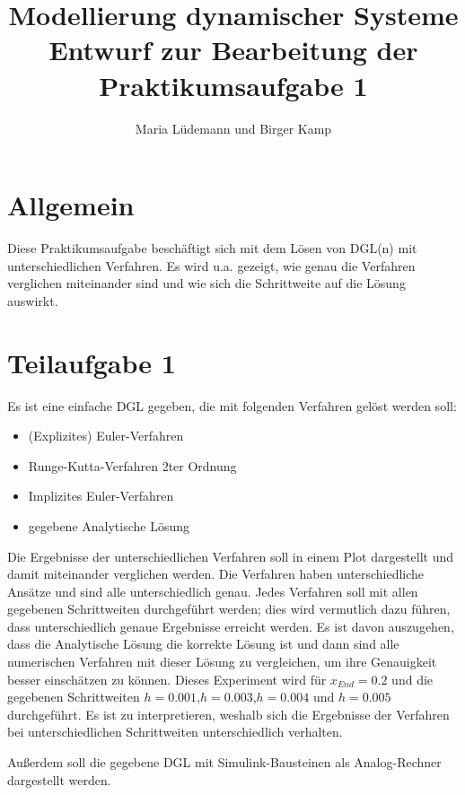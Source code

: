 \documentclass[]{scrartcl}
\title{Modellierung dynamischer Systeme  \\ Entwurf zur Bearbeitung der Praktikumsaufgabe 1}
\author{Maria Lüdemann und Birger Kamp}
\begin{document}
\maketitle

\begin{abstract}

\end{abstract}

\section{Allgemein}
Diese Praktikumsaufgabe beschäftigt sich mit dem Lösen von DGL(n) mit unterschiedlichen Verfahren. Es wird u.a. gezeigt, wie genau die Verfahren verglichen miteinander sind und wie sich die Schrittweite auf die Lösung auswirkt.

\section{Teilaufgabe 1}
Es ist eine einfache DGL gegeben, die mit folgenden Verfahren gelöst werden soll:

\begin{itemize}
	\item (Explizites) Euler-Verfahren
	\item Runge-Kutta-Verfahren 2ter Ordnung
	\item Implizites Euler-Verfahren
	\item gegebene Analytische Lösung
\end{itemize}

Die Ergebnisse der unterschiedlichen Verfahren soll in einem Plot dargestellt und damit miteinander verglichen werden. Die Verfahren haben unterschiedliche Ansätze und sind alle unterschiedlich genau. Jedes Verfahren soll mit allen gegebenen Schrittweiten durchgeführt werden; dies wird vermutlich dazu führen, dass unterschiedlich genaue Ergebnisse erreicht werden. Es ist davon auszugehen, dass die Analytische Lösung die korrekte Lösung ist und dann sind alle numerischen Verfahren mit dieser Lösung zu vergleichen, um ihre Genauigkeit besser einschätzen zu können. Dieses Experiment wird für $x_{End} = 0.2$ und die gegebenen Schrittweiten $h=0.001$,$h=0.003$,$h=0.004$  und $h=0.005$ durchgeführt. Es ist zu interpretieren, weshalb sich die Ergebnisse der Verfahren bei unterschiedlichen Schrittweiten unterschiedlich verhalten.

Außerdem soll die gegebene DGL mit Simulink-Bausteinen als Analog-Rechner dargestellt werden.
\end{document}
